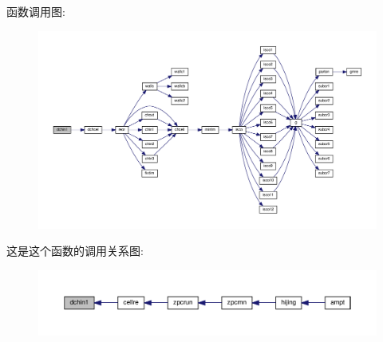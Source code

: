 函数调用图\+:
\nopagebreak
\begin{figure}[H]
\begin{center}
\leavevmode
\includegraphics[width=350pt]{dchin1_8f90_a32ea10453544eb3503437afd89f14439_cgraph}
\end{center}
\end{figure}
这是这个函数的调用关系图\+:
\nopagebreak
\begin{figure}[H]
\begin{center}
\leavevmode
\includegraphics[width=350pt]{dchin1_8f90_a32ea10453544eb3503437afd89f14439_icgraph}
\end{center}
\end{figure}
